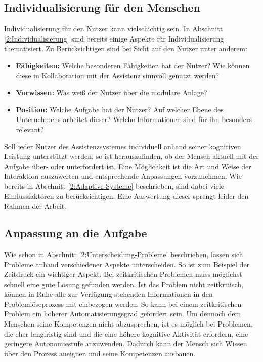 \subsection{Individualisierung für den Menschen}
Individualisierung für den Nutzer kann vielschichtig sein. In Abschnitt \ref{2:Individualisierung} sind bereits einige Aspekte für Individualisierung thematisiert. Zu Berücksichtigen sind bei Sicht auf den Nutzer unter anderem:
\begin{itemize}
\item \textbf{Fähigkeiten:} Welche besonderen Fähigkeiten hat der Nutzer? Wie können diese in Kollaboration mit der Assistenz sinnvoll genutzt werden?
\item \textbf{Vorwissen:} Was weiß der Nutzer über die modulare Anlage?
\item \textbf{Position:} Welche Aufgabe hat der Nutzer? Auf welcher Ebene des Unternehmens arbeitet dieser? Welche Informationen sind für ihn besonders relevant?
\end{itemize}
Soll jeder Nutzer des Assistenzsystemes individuell anhand seiner kognitiven Leistung unterstützt werden, so ist herauszufinden, ob der Mensch aktuell mit der Aufgabe über- oder unterfordert ist. Eine Möglichkeit ist die Art und Weise der Interaktion auszuwerten und entsprechende Anpassungen vorzunehmen. Wie bereits in Abschnitt \ref{2:Adaptive-Systeme} beschrieben, sind dabei viele Einflussfaktoren zu berücksichtigen. Eine Auswertung dieser sprengt leider den Rahmen der Arbeit. 

\subsection{Anpassung an die Aufgabe}
\label{3:Anpassung-Aufgabe}
Wie schon in Abschnitt \ref{2:Unterscheidung-Probleme} beschrieben, lassen sich Probleme anhand verschiedener Aspekte unterscheiden. So ist zum Beispiel der Zeitdruck ein wichtiger Aspekt. Bei zeitkritischen Problemen muss möglichst schnell eine gute Lösung gefunden werden. Ist das Problem nicht zeitkritisch, können in Ruhe alle zur Verfügung stehenden Informationen in den Problemlöseprozess mit einbezogen werden. So kann bei einem zeitkritischen Problem ein höherer Automatisierungsgrad gefordert sein. Um dennoch dem Menschen seine Kompetenzen nicht abzusprechen, ist es möglich bei Problemen, die eher langfristig sind und die eine höhere kognitive Aktivität erfordern, eine geringere Autonomiestufe anzuwenden. Dadurch kann der Mensch sich Wissen über den Prozess aneignen und seine Kompetenzen ausbauen.

